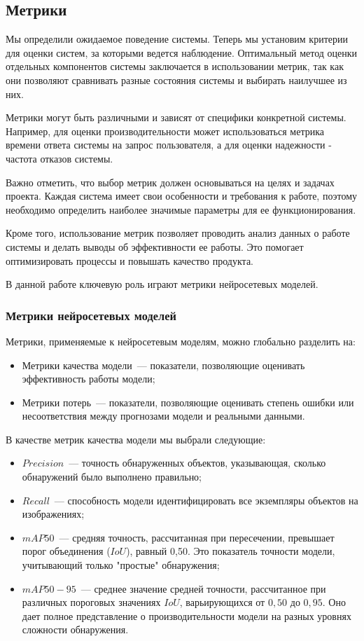 \subsection{Метрики}
Мы определили ожидаемое поведение системы. Теперь мы установим критерии для оценки систем, за которыми ведется наблюдение. Оптимальный метод оценки отдельных компонентов системы заключается в использовании метрик, так как они позволяют сравнивать разные состояния системы и выбирать наилучшее из них.

Метрики могут быть различными и зависят от специфики конкретной системы. Например, для оценки производительности может использоваться метрика времени ответа системы на запрос пользователя, а для оценки надежности - частота отказов системы.

Важно отметить, что выбор метрик должен основываться на целях и задачах проекта. Каждая система имеет свои особенности и требования к работе, поэтому необходимо определить наиболее значимые параметры для ее функционирования.

Кроме того, использование метрик позволяет проводить анализ данных о работе системы и делать выводы об эффективности ее работы. Это помогает оптимизировать процессы и повышать качество продукта.

В данной работе ключевую роль играют метрики нейросетевых моделей.

\subsubsection{Метрики нейросетевых моделей}

Метрики, применяемые к нейросетевым моделям, можно глобально разделить на:
\begin{itemize}
    \item Метрики качества модели~--- показатели, позволяющие оценивать эффективность работы модели;
    \item Метрики потерь~--- показатели, позволяющие оценивать степень ошибки или несоответствия между прогнозами модели и реальными данными.
\end{itemize}

В качестве метрик качества модели мы выбрали следующие:

\begin{itemize}
    \item $Precision$~--- точность обнаруженных объектов, указывающая, сколько обнаружений было выполнено правильно;
    \item $Recall$~--- способность модели идентифицировать все экземпляры объектов на изображениях;
    \item $mAP50$~--- средняя точность, рассчитанная при пересечении, превышает порог объединения ($IoU$), равный 0,50. Это показатель точности модели, учитывающий только "простые" обнаружения;
    \item $mAP50-95$~--- среднее значение средней точности, рассчитанное при различных пороговых значениях $IoU$, варьирующихся от $0,50$ до $0,95$. Оно дает полное представление о производительности модели на разных уровнях сложности обнаружения.
\end{itemize}

